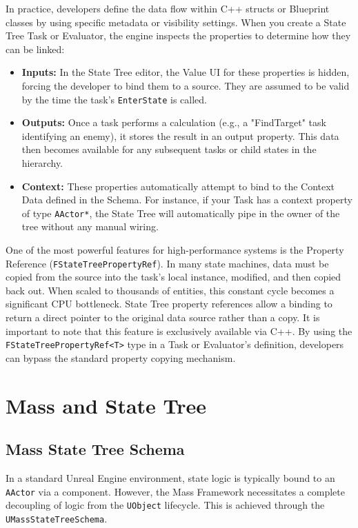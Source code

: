 In practice, developers define the data flow within C++ structs or Blueprint classes by using specific metadata or visibility settings. When you create a State Tree Task or Evaluator, the engine inspects the properties to determine how they can be linked:

\begin{itemize}
    \item \textbf{Inputs:} In the State Tree editor, the Value UI for these properties is hidden, forcing the developer to bind them to a source. They are assumed to be valid by the time the task's \texttt{EnterState} is called.
    \item \textbf{Outputs:} Once a task performs a calculation (e.g., a "FindTarget" task identifying an enemy), it stores the result in an output property. This data then becomes available for any subsequent tasks or child states in the hierarchy.
    \item \textbf{Context:} These properties automatically attempt to bind to the Context Data defined in the Schema. For instance, if your Task has a context property of type \texttt{AActor*}, the State Tree will automatically pipe in the owner of the tree without any manual wiring.
\end{itemize}

One of the most powerful features for high-performance systems is the Property Reference (\texttt{FStateTreePropertyRef}). In many state machines, data must be copied from the source into the task’s local instance, modified, and then copied back out. When scaled to thousands of entities, this constant cycle becomes a significant CPU bottleneck. State Tree property references allow a binding to return a direct pointer to the original data source rather than a copy. It is important to note that this feature is exclusively available via C++. By using the \texttt{FStateTreePropertyRef<T>} type in a Task or Evaluator’s definition, developers can bypass the standard property copying mechanism.

\section{Mass and State Tree}

\subsection{Mass State Tree Schema}

In a standard Unreal Engine environment, state logic is typically bound to an \texttt{AActor} via a component. However, the Mass Framework necessitates a complete decoupling of logic from the \texttt{UObject} lifecycle. This is achieved through the \texttt{UMassStateTreeSchema}.

